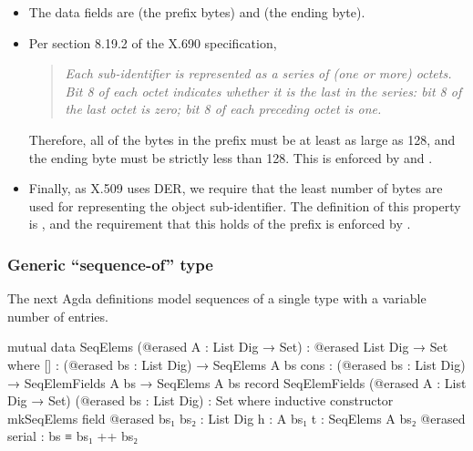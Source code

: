 \documentclass[11pt]{article}
\begin{document}
\begin{itemize}
\item The data fields are  (the prefix bytes) and 
(the ending byte).

\item Per section 8.19.2 of the X.690 specification,

\begin{quote}
\emph{Each sub-identifier is represented as a series of (one or more) octets. Bit 8
of each octet indicates whether it is the last in the series: bit 8 of the}
\emph{last octet is zero; bit 8 of each preceding octet is one.}
\end{quote}

Therefore, all of the bytes in the prefix must be at least as large as 128,
and the ending byte must be strictly less than 128.
This is enforced by  and .

\item Finally, as X.509 uses DER, we require that the least number of bytes are
used for representing the object sub-identifier.
The definition of this property is , and the
requirement that this holds of the prefix  is enforced by
.
\end{itemize}

\subsubsection{Generic ``sequence-of'' type}
\label{sec:orgfd83c9e}

The next Agda definitions model sequences of a single type with a variable
number of entries.

\begin{code}
mutual
  data SeqElems (@erased A : List Dig → Set) : @erased List Dig → Set where
    []   : (@erased bs : List Dig) → SeqElems A bs
    cons : (@erased bs : List Dig) → SeqElemFields A bs → SeqElems A bs
  record SeqElemFields (@erased A : List Dig → Set) (@erased bs : List Dig) : Set where
    inductive
    constructor mkSeqElems
    field
      @erased bs₁ bs₂ : List Dig
      h : A bs₁
      t : SeqElems A bs₂
      @erased serial : bs ≡ bs₁ ++ bs₂
\end{code}
\end{document}
